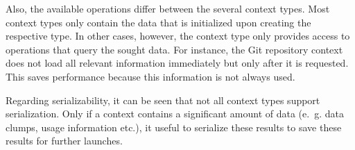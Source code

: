 Also, the available operations differ between  the several context types. Most context types only contain the data that is initialized upon creating the respective type. In other cases, however, the context type only provides access to operations that query the sought data. For instance, the Git repository context does not load all relevant information immediately but only after it is requested. This saves performance because this information is not always used. 

Regarding serializability, it can be seen that not all context types support serialization. Only if a context contains a significant amount of data (e.~g. data clumps, usage information etc.), it useful to serialize these results to save these results for further launches. 
